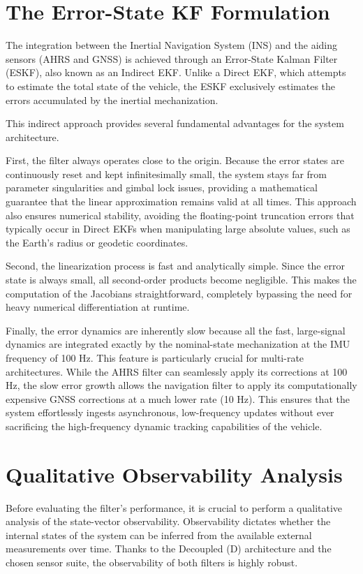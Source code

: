 \documentclass[a4paper,twoside,openany]{report}
\begin{document}
\section{The Error-State KF Formulation}

The integration between the Inertial Navigation System (INS) and the aiding sensors (AHRS and GNSS) is achieved through an Error-State Kalman Filter (ESKF), also known as an Indirect EKF. Unlike a Direct EKF, which attempts to estimate the total state of the vehicle, the ESKF exclusively estimates the errors accumulated by the inertial mechanization.

This indirect approach provides several fundamental advantages for the system architecture.

First, the filter always operates close to the origin. Because the error states are continuously reset and kept infinitesimally small, the system stays far from parameter singularities and gimbal lock issues, providing a mathematical guarantee that the linear approximation remains valid at all times. This approach also ensures numerical stability, avoiding the floating-point truncation errors that typically occur in Direct EKFs when manipulating large absolute values, such as the Earth's radius or geodetic coordinates.

Second, the linearization process is fast and analytically simple. Since the error state is always small, all second-order products become negligible. This makes the computation of the Jacobians straightforward, completely bypassing the need for heavy numerical differentiation at runtime.

Finally, the error dynamics are inherently slow because all the fast, large-signal dynamics are integrated exactly by the nominal-state mechanization at the IMU frequency of 100 Hz. This feature is particularly crucial for multi-rate architectures. While the AHRS filter can seamlessly apply its corrections at 100 Hz, the slow error growth allows the navigation filter to apply its computationally expensive GNSS corrections at a much lower rate (10 Hz). This ensures that the system effortlessly ingests asynchronous, low-frequency updates without ever sacrificing the high-frequency dynamic tracking capabilities of the vehicle.

\section{Qualitative Observability Analysis}

Before evaluating the filter's performance, it is crucial to perform a qualitative analysis of the state-vector observability. Observability dictates whether the internal states of the system can be inferred from the available external measurements over time. Thanks to the Decoupled (D) architecture and the chosen sensor suite, the observability of both filters is highly robust.
\end{document}
